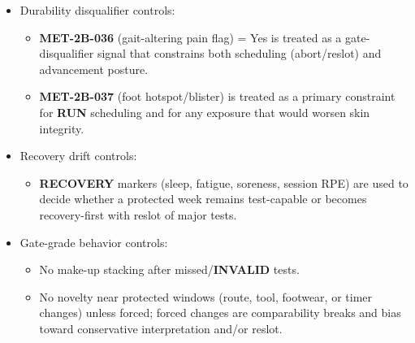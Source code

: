 \documentclass[10pt]{article}
\begin{document}
\begin{itemize}
\begin{itemize}
\item Avoid clustering \textbf{CAL} battery too close to \textbf{RUN} \textbf{TT} or \textbf{STR} proxy sessions; respect Stage 3 spacing intent.
\end{itemize}
\item Durability disqualifier controls:
\begin{itemize}
\item \textbf{MET-2B-036} (gait-altering pain flag) = Yes is treated as a gate-disqualifier signal that constrains both scheduling (abort/reslot) and advancement posture.
\item \textbf{MET-2B-037} (foot hotspot/blister) is treated as a primary constraint for \textbf{RUN} scheduling and for any exposure that would worsen skin integrity.
\end{itemize}
\item Recovery drift controls:
\begin{itemize}
\item \textbf{RECOVERY} markers (sleep, fatigue, soreness, session RPE) are used to decide whether a protected week remains test-capable or becomes recovery-first with reslot of major tests.
\end{itemize}
\item Gate-grade behavior controls:
\begin{itemize}
\item No make-up stacking after missed/\textbf{INVALID} tests.
\item No novelty near protected windows (route, tool, footwear, or timer changes) unless forced; forced changes are comparability breaks and bias toward conservative interpretation and/or reslot.
\end{itemize}
\end{itemize}
\end{document}
